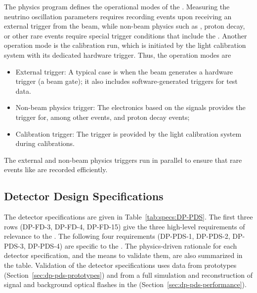 The physics program defines the operational modes of the \dual {}. Measuring the neutrino oscillation parameters requires recording events upon receiving an external trigger from the beam, while non-beam physics such as , proton decay, or other rare events require special trigger conditions that include the . Another operation mode is the  calibration run, which is initiated by the light calibration system with its dedicated hardware trigger.
%
Thus, the operation modes are
\begin{itemize}
\item External trigger:  
A typical case is when the beam generates a hardware trigger (a beam gate);  it also includes software-generated triggers for test data.
\item Non-beam physics trigger: The electronics based on the  signals provides the trigger for, among other events,  and proton decay events;
\item Calibration trigger: The trigger is provided by the light calibration system during  calibrations.
\end{itemize}

The external and non-beam physics triggers run in parallel to ensure that rare events like  are recorded efficiently. 

\subsection{Detector Design Specifications}
\label{sec:dp-pds-overview_specs}

The \dual {} detector specifications are given in Table~\ref{tab:specs:DP-PDS}. The first three rows (DP-FD-3, DP-FD-4, DP-FD-15) give the three  high-level requirements of relevance to the . The following four requirements (DP-PDS-1, DP-PDS-2, DP-PDS-3, DP-PDS-4) are specific to the . The physics-driven rationale for each detector specification, and the means to validate them, are also summarized in the table. Validation of the detector specifications uses data from  prototypes (Section~\ref{sec:dp-pds-prototypes}) and from a full simulation and reconstruction of signal and background optical flashes in the \dpmod (Section~\ref{sec:dp-pds-performance}). 



